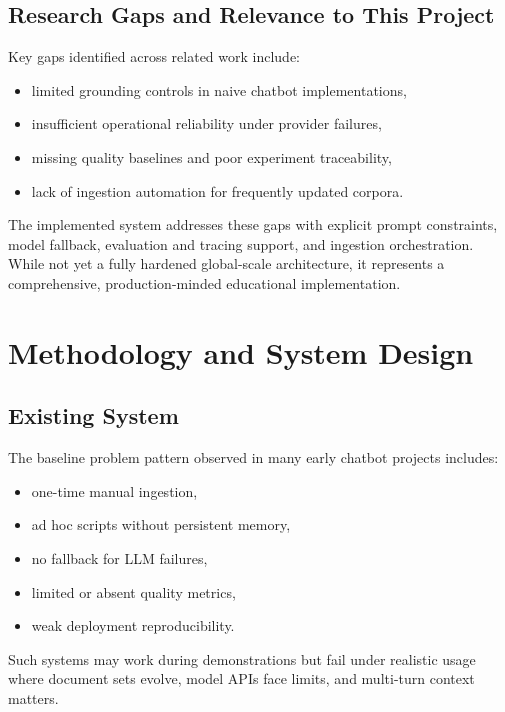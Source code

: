 \documentclass[12pt,letterpaper]{report}
\begin{document}
\section{Research Gaps and Relevance to This Project}
Key gaps identified across related work include:
\begin{itemize}
\item limited grounding controls in naive chatbot implementations,
\item insufficient operational reliability under provider failures,
\item missing quality baselines and poor experiment traceability,
\item lack of ingestion automation for frequently updated corpora.
\end{itemize}

The implemented system addresses these gaps with explicit prompt constraints, model fallback, evaluation and tracing support, and ingestion orchestration. While not yet a fully hardened global-scale architecture, it represents a comprehensive, production-minded educational implementation.

\chapter{Methodology and System Design}

\section{Existing System}
The baseline problem pattern observed in many early chatbot projects includes:
\begin{itemize}
\item one-time manual ingestion,
\item ad hoc scripts without persistent memory,
\item no fallback for LLM failures,
\item limited or absent quality metrics,
\item weak deployment reproducibility.
\end{itemize}

Such systems may work during demonstrations but fail under realistic usage where document sets evolve, model APIs face limits, and multi-turn context matters.
\end{document}
